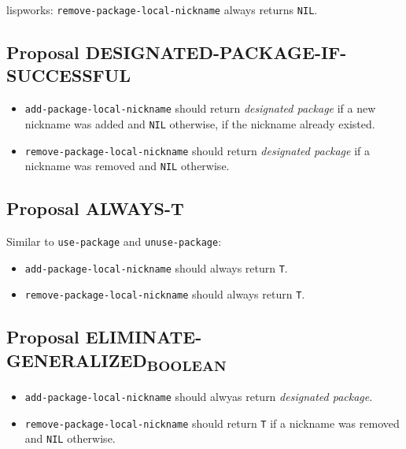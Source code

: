 \documentclass[11pt]{article}
\begin{document}
lispworks:
  \texttt{remove-package-local-nickname} always returns \texttt{NIL}.
\subsection{Proposal DESIGNATED-PACKAGE-IF-SUCCESSFUL}
\label{sec:orge739e84}
\begin{itemize}
\item \texttt{add-package-local-nickname} should return \emph{designated package} if a new nickname
was added and \texttt{NIL} otherwise, if the nickname already existed.
\item \texttt{remove-package-local-nickname} should return \emph{designated package} if a nickname
was removed and \texttt{NIL} otherwise.
\end{itemize}
\subsection{Proposal ALWAYS-T}
\label{sec:orgb839018}
Similar to \texttt{use-package} and \texttt{unuse-package}:
\begin{itemize}
\item \texttt{add-package-local-nickname} should always return \texttt{T}.
\item \texttt{remove-package-local-nickname} should always return \texttt{T}.
\end{itemize}
\subsection{Proposal ELIMINATE-GENERALIZED\textsubscript{BOOLEAN}}
\label{sec:org57f0660}
\begin{itemize}
\item \texttt{add-package-local-nickname} should alwyas return \emph{designated package}.
\item \texttt{remove-package-local-nickname} should return \texttt{T} if a nickname was removed and
\texttt{NIL} otherwise.
\end{itemize}
\end{document}
